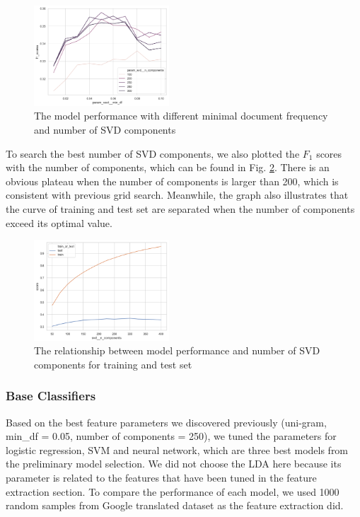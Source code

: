 \documentclass[compsoc]{IEEEtran}
\begin{document}
\begin{figure}[htbp]
\centering
\includegraphics[width=0.45\textwidth]{min_df_comp.png}
\caption{The model performance with different minimal document frequency and number of SVD components}
\label{fig:min_df_comp}
\end{figure}

To search the best number of SVD components, we also plotted the $F_1$ scores with the number of components, which can be found in Fig. \ref{fig:svdn-tt}. There is an obvious plateau when the number of components is larger than 200, which is consistent with previous grid search. Meanwhile, the graph also illustrates that the curve of training and test set are separated when the number of components exceed its optimal value. 

\begin{figure}[htbp]
\centering
\includegraphics[width=0.45\textwidth]{svdn-tt.png}
\caption{The relationship between model performance and number of SVD components for training and test set}
\label{fig:svdn-tt}
\end{figure}

\subsubsection{Base Classifiers}

Based on the best feature parameters we discovered previously (uni-gram, min\_df = 0.05, number of components = 250), we tuned the parameters for logistic regression, SVM and neural network, which are three best models from the preliminary model selection. We did not choose the LDA here because its parameter is related to the features that have been tuned in the feature extraction section. To compare the performance of each model, we used 1000 random samples from Google translated dataset as the feature extraction did. 
\end{document}

